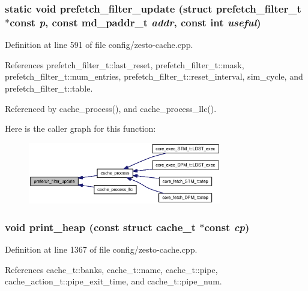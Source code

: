\subsubsection[{prefetch\_\-filter\_\-update}]{\setlength{\rightskip}{0pt plus 5cm}static void prefetch\_\-filter\_\-update (struct {\bf prefetch\_\-filter\_\-t} $\ast$const  {\em p}, \/  const {\bf md\_\-paddr\_\-t} {\em addr}, \/  const int {\em useful})\hspace{0.3cm}{\tt  [static]}}\label{config_2zesto-cache_8cpp_7867a082122e5a85b7e880d3bfb243f9}




Definition at line 591 of file config/zesto-cache.cpp.

References prefetch\_\-filter\_\-t::last\_\-reset, prefetch\_\-filter\_\-t::mask, prefetch\_\-filter\_\-t::num\_\-entries, prefetch\_\-filter\_\-t::reset\_\-interval, sim\_\-cycle, and prefetch\_\-filter\_\-t::table.

Referenced by cache\_\-process(), and cache\_\-process\_\-llc().

Here is the caller graph for this function:\nopagebreak
\begin{figure}[H]
\begin{center}
\leavevmode
\includegraphics[width=239pt]{config_2zesto-cache_8cpp_7867a082122e5a85b7e880d3bfb243f9_icgraph}
\end{center}
\end{figure}
\subsubsection[{print\_\-heap}]{\setlength{\rightskip}{0pt plus 5cm}void print\_\-heap (const struct {\bf cache\_\-t} $\ast$const  {\em cp})}\label{config_2zesto-cache_8cpp_85af5d6eb3231dd22e161c347a5fd72b}




Definition at line 1367 of file config/zesto-cache.cpp.

References cache\_\-t::banks, cache\_\-t::name, cache\_\-t::pipe, cache\_\-action\_\-t::pipe\_\-exit\_\-time, and cache\_\-t::pipe\_\-num.
